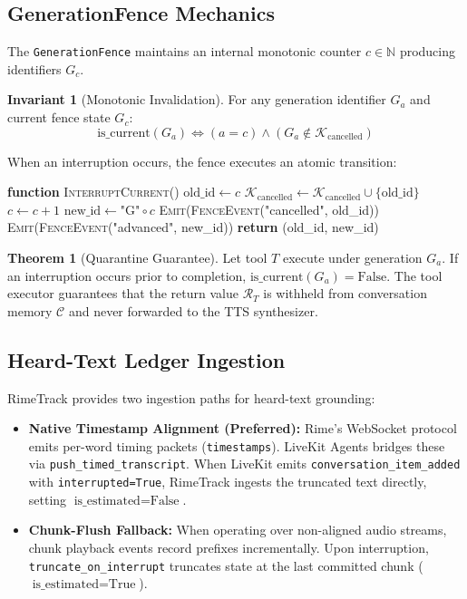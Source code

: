 \documentclass[10pt,journal,compsoc]{IEEEtran}
\theoremstyle{definition}
\newtheorem{theorem}{Theorem}
\newtheorem{invariant}{Invariant}
\begin{document}
\subsection{GenerationFence Mechanics}
The \texttt{GenerationFence} maintains an internal monotonic counter $c \in \mathbb{N}$ producing identifiers $G_c$. 

\begin{invariant}[Monotonic Invalidation]
For any generation identifier $G_a$ and current fence state $G_c$:
\begin{equation}
\text{is\_current}(G_a) \iff (a = c) \land (G_a \notin \mathcal{K}_{\text{cancelled}})
\end{equation}
\end{invariant}

When an interruption occurs, the fence executes an atomic transition:
\begin{algorithmic}[1]
\STATE \textbf{function} \textsc{InterruptCurrent}()
\STATE \quad $\text{old\_id} \gets c$
\STATE \quad $\mathcal{K}_{\text{cancelled}} \gets \mathcal{K}_{\text{cancelled}} \cup \{\text{old\_id}\}$
\STATE \quad $c \gets c + 1$
\STATE \quad $\text{new\_id} \gets \text{"G"} \circ c$
\STATE \quad \textsc{Emit}(\textsc{FenceEvent}("cancelled", old\_id))
\STATE \quad \textsc{Emit}(\textsc{FenceEvent}("advanced", new\_id))
\STATE \quad \textbf{return} (old\_id, new\_id)
\end{algorithmic}

\begin{theorem}[Quarantine Guarantee]
Let tool $T$ execute under generation $G_a$. If an interruption occurs prior to completion, $\text{is\_current}(G_a) = \text{False}$. The tool executor guarantees that the return value $\mathcal{R}_T$ is withheld from conversation memory $\mathcal{C}$ and never forwarded to the TTS synthesizer.
\end{theorem}

\subsection{Heard-Text Ledger Ingestion}
RimeTrack provides two ingestion paths for heard-text grounding:
\begin{itemize}
    \item \textbf{Native Timestamp Alignment (Preferred):} Rime's WebSocket protocol emits per-word timing packets (\texttt{timestamps}). LiveKit Agents bridges these via \texttt{push\_timed\_transcript}. When LiveKit emits \texttt{conversation\_item\_added} with \texttt{interrupted=True}, RimeTrack ingests the truncated text directly, setting $\text{is\_estimated} = \text{False}$.
    \item \textbf{Chunk-Flush Fallback:} When operating over non-aligned audio streams, chunk playback events record prefixes incrementally. Upon interruption, \texttt{truncate\_on\_interrupt} truncates state at the last committed chunk ($\text{is\_estimated} = \text{True}$).
\end{itemize}
\end{document}

